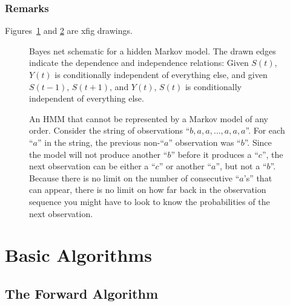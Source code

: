 \documentclass[prelim,showlabels]{book}
\newcommand{\ti}[2]{{#1}{(#2)}}                  %
\begin{document}
\subsection{Remarks}
\label{sec:DHMMRemarks}

Figures~\ref{fig:dhmm_net} and \ref{fig:nonmm} are xfig drawings.
\begin{figure}[htbp]
  \centering{
    
  }
  \caption[Bayes net schematic for a hidden Markov model.]%
  {Bayes net schematic for a hidden Markov model.  The drawn edges
    indicate the dependence and independence relations: Given
    $\ti{S}{t}$, $\ti{Y}{t}$ is conditionally independent of
    everything else, and given $\ti{S}{t-1}$, $\ti{S}{t+1}$, and
    $\ti{Y}{t}$, $\ti{S}{t}$ is conditionally independent of
    everything else.}
  \label{fig:dhmm_net}
\end{figure}

\begin{figure}[htbp]
  \centering{
    
  }
  \caption[An HMM that cannot be represented by a
  Markov model.]%
  {An HMM that cannot be represented by a Markov model of any order.
    Consider the string of observations ``$b,a,a,\ldots,a,a,a$''.  For
    each ``$a$'' in the string, the previous non-``$a$'' observation
    was ``$b$''.  Since the model will not produce another ``$b$'' before
    it produces a ``$c$'', the next observation can be either a
    ``$c$'' or another ``$a$'', but not a ``$b$''.  Because there is
    no limit on the number of consecutive ``$a$'s'' that can appear,
    there is no limit on how far back in the observation sequence you
    might have to look to know the probabilities of the next
    observation.}
  \label{fig:nonmm}
\end{figure}

\chapter{Basic Algorithms}
\label{chap:algorithms}

\section{The Forward Algorithm}
\label{sec:forward}
\end{document}
